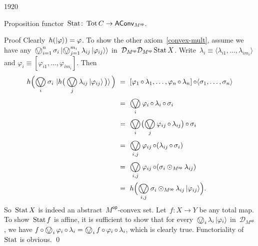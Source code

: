 \begin{parsec}{1920}
\begin{point}{70}{Proposition}
    functor~$\operatorname{Stat} \colon \operatorname{Tot} C \to \mathsf{AConv}_{M^{\mathsf{op}}}$.~\cite{effintro}
\begin{point}{80}{Proof}%
Clearly~$h(\ket{\varphi}) = \varphi$.
To show the other axiom~\eqref{convex-mult},
assume we have any~$\bigovee^n_{i=1} \sigma_i \ket{\bigovee^{m_i}_{j=1} \lambda_{ij} \ket{\varphi_{ij}}}$
in~$\mathcal{D}_{M^\mathsf{op}} \mathcal{D}_{M^{\mathsf{op}}} \operatorname{Stat} X$.
Write~$\lambda_i \equiv \langle\lambda_{i1}, \ldots, \lambda_{im_i}\rangle$
and $\varphi_i \equiv [\varphi_{i1}, \ldots, \varphi_{i{m_i}}]$.
Then
\begin{align*}
    h \Bigl( \bigovee_i \sigma_i \, \ket{
        h\bigl(\, \bigovee_j \lambda_{ij} \ket{\varphi_{ij}}\, \bigr)
    } \, \Bigr)
    &\ = \ 
    [\varphi_1 \after \lambda_1, \ldots, 
    \varphi_n \after \lambda_n] \after \langle
    \sigma_1, \ldots, \sigma_n
    \rangle
    \\ & \ = \ 
    \bigovee_{i} \varphi_i \after \lambda_i \after \sigma_i
    \\ & \ = \ 
    \bigovee_{i} \bigl(\bigovee_j \varphi_{ij} \after \lambda_{ij}\bigr) \after \sigma_i
    \\ & \ = \ 
    \bigovee_{i,j} \varphi_{ij} \after (\lambda_{ij} \after \sigma_i)
    \\ & \ = \ 
    \bigovee_{i,j} \varphi_{ij} \after (\sigma_i \odot_{M^{\mathsf{op}}} \lambda_{ij})
    \\ & \ = \ 
    h \Bigl( \bigovee_{i,j} \sigma_i \odot_{M^{\mathsf{op}}} \lambda_{ij} \ket{\varphi_{ij}} \Bigr).
\end{align*}
So~$\operatorname{Stat} X$ is indeed an abstract~$M^{\mathsf{op}}$-convex set.
Let~$f\colon X \to Y$ be any total map.
To show~$\operatorname{Stat} f$ is affine,
it is sufficient to show that
for every~$\bigovee_i \lambda_i \ket{\varphi_i}$
 in~$\mathcal{D}_{M^{\mathsf{op}}}$,
 we have
        $f \after \bigovee_i  \varphi_i \after \lambda_i 
         = 
        \bigovee_i f \after  \varphi_i \after \lambda_i$,
        which is clearly true.
    Functoriality of~$\operatorname{Stat}$ is obvious. \qed
\end{point}
\end{point}
\end{parsec}

